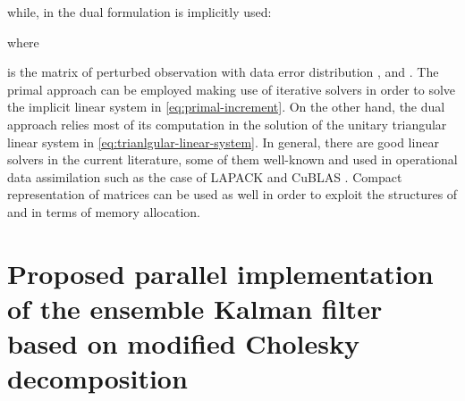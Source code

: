 \documentclass[12pt]{article}
\begin{document}
while, in the dual formulation  is implicitly used:

where

 is the matrix of perturbed observation with data error distribution , and . The primal approach can be employed making use of iterative solvers in order to solve the implicit linear system in \eqref{eq:primal-increment}. On the other hand, the dual approach relies most of its computation in the solution of the unitary triangular linear system in \eqref{eq:trianlgular-linear-system}. In general, there are good linear solvers in the current literature, some of them well-known and used in operational data assimilation such as the case of LAPACK \cite{LAPACKLIB} and CuBLAS \cite{BLASLIB}. Compact representation of matrices can be used as well in order to exploit the structures of  and  in terms of memory allocation.

\section{Proposed parallel implementation of the ensemble Kalman filter based on modified Cholesky decomposition}
\label{sec:parallel-implementation}
\end{document}
